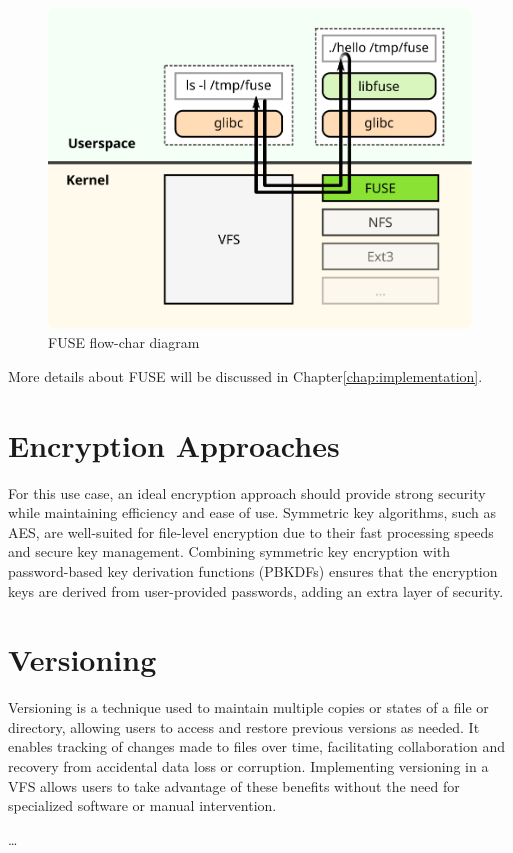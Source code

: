 \begin{figure}[ht]
    \centering
    \includegraphics[width=\linewidth]{img/fuse_diagram.svg}
    \caption{FUSE flow-char diagram}
    \label{fig:fuse-diagram}
\end{figure}

More details about FUSE will be discussed in Chapter\ref{chap:implementation}.

\section{Encryption Approaches}\label{sec:encryption-approaches}

For this use case, an ideal encryption approach should provide strong security while maintaining efficiency and ease of use.
Symmetric key algorithms, such as AES, are well-suited for file-level encryption due to their fast processing speeds and secure key management.
Combining symmetric key encryption with password-based key derivation functions (PBKDFs) ensures that the encryption keys are derived from user-provided passwords, adding an extra layer of security.

\section{Versioning}\label{sec:versioning}

Versioning is a technique used to maintain multiple copies or states of a file or directory, allowing users to access and restore previous versions as needed.
It enables tracking of changes made to files over time, facilitating collaboration and recovery from accidental data loss or corruption.
Implementing versioning in a VFS allows users to take advantage of these benefits without the need for specialized software or manual intervention.



\ldots